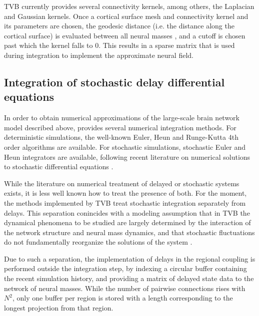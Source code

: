 	TVB currently provides several connectivity kernels, among others, 
	the Laplacian and Gaussian kernels. Once a cortical surface mesh 
	and connectivity kernel and its parameters are chosen, the geodesic
	distance (i.e. the distance along the cortical surface) is evaluated
	between all neural masses \cite{Mitchell1987}, and a cutoff is chosen
	past which the kernel falls to 0. This results in a sparse matrix that 
	is used during integration to implement the approximate neural field. 

\subsection{Integration of stochastic delay differential equations}

	In order to obtain numerical approximations of the large-scale brain network model 
	described above, \TVB provides several numerical integration methods. For
	deterministic simulations, the well-known Euler, 
	Heun and Runge-Kutta 4th order 
	algorithms are available. For stochastic
	simulations, stochastic Euler and Heun integrators are available, 
	following recent literature on numerical solutions to stochastic
	differential equations \cite{Kloeden_1995,Mannella_2002,Mannella_1989}.

	While the literature on numerical treatment of delayed or 
	stochastic systems exists, it is less well known how to treat 
	the presence of both. For the moment, the methods implemented by TVB
	treat stochastic integration separately from delays. 
	This separation conincides with a modeling assumption that in
	TVB the dynamical phenomena to be studied are largely determined
	by the interaction of the network structure and neural mass dynamics, 
	and that stochastic fluctuations do not fundamentally reorganize the
	solutions of the system \cite{Ghosh_2008,Deco_2009,Deco_2011,Deco_Senden_2012}.

	Due to such a separation, the implementation of delays in the
	regional coupling is performed outside the integration step,
	by indexing a circular buffer containing the recent simulation 
	history, and providing a matrix of delayed state data to the 
	network of neural masses. While the number of pairwise
	connections rises with $N^2$, only one buffer per region 
	is stored with a length corresponding to the longest projection
	from that region.

